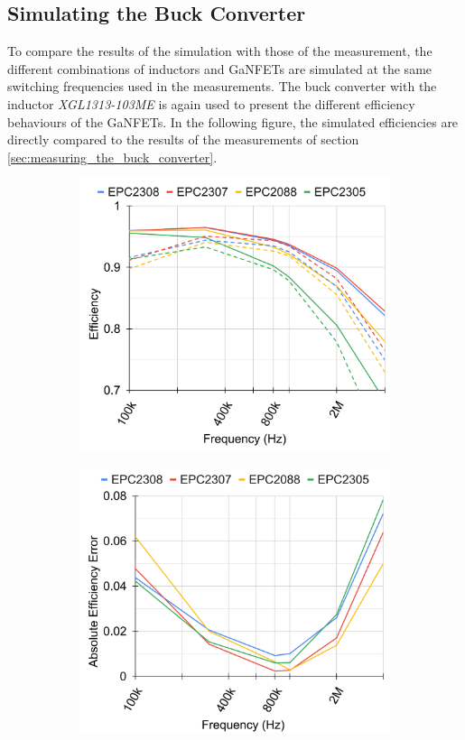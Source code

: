 \subsection{Simulating the Buck Converter}\label{sec:simulating_the_buck_converter}
To compare the results of the simulation with those of the measurement, the different combinations of inductors and \acp{GaNFET} are simulated at the same switching frequencies used in the measurements. The buck converter with the inductor \textit{XGL1313-103ME} is again used to present the different efficiency behaviours of the \acp{GaNFET}. In the following figure, the simulated efficiencies are directly compared to the results of the measurements of section \ref{sec:measuring_the_buck_converter}. 
\begin{figure}[H]
    \begin{subfigure}[b]{0.50\textwidth}
        \includegraphics[width=\textwidth]{Bilder/Kapitel4/XGL103 Efficiency Simulated and measured.png}
    \end{subfigure}
    \begin{subfigure}[b]{0.50\textwidth}
        \includegraphics[width=\textwidth]{Bilder/Kapitel4/XGL103 Efficiency Simulated and measured error.png}

\end{subfigure}
\end{figure}
